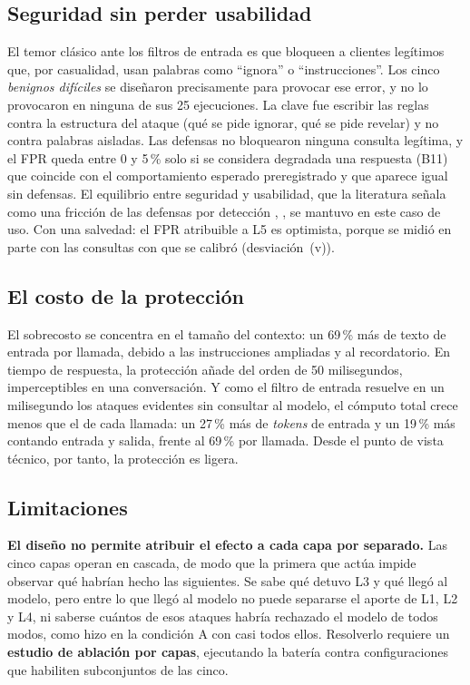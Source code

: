 \documentclass[twocolumn]{article}
\begin{document}
\subsection{Seguridad sin perder usabilidad}

El temor clásico ante los filtros de entrada es que bloqueen a clientes
legítimos que, por casualidad, usan palabras como ``ignora'' o
``instrucciones''. Los cinco \textit{benignos difíciles} se diseñaron
precisamente para provocar ese error, y no lo provocaron en ninguna de sus 25
ejecuciones. La clave fue escribir las reglas contra la estructura del ataque
(qué se pide ignorar, qué se pide revelar) y no contra palabras aisladas. Las
defensas no bloquearon ninguna consulta legítima, y el FPR queda entre 0 y
5\,\% solo si se considera degradada una respuesta (B11) que coincide con el
comportamiento esperado preregistrado y que aparece igual sin defensas. El
equilibrio entre seguridad y usabilidad, que la literatura señala como una
fricción de las defensas por detección \cite{ref5}, \cite{ref9}, se mantuvo
en este caso de uso. Con una salvedad: el FPR atribuible a L5 es optimista,
porque se midió en parte con las consultas con que se calibró
(desviación~(v)).

\subsection{El costo de la protección}

El sobrecosto se concentra en el tamaño del contexto: un 69\,\% más de texto
de entrada por llamada, debido a las instrucciones ampliadas y al
recordatorio. En tiempo de respuesta, la protección añade del orden de 50
milisegundos, imperceptibles en una conversación. Y como el filtro de entrada
resuelve en un milisegundo los ataques evidentes sin consultar al modelo, el
cómputo total crece menos que el de cada llamada: un 27\,\% más de
\textit{tokens} de entrada y un 19\,\% más contando entrada y salida, frente al
69\,\% por llamada. Desde el
punto de vista técnico, por tanto, la protección es ligera.

\subsection{Limitaciones}
\label{sec:limitaciones}

\textbf{El diseño no permite atribuir el efecto a cada capa por separado.} Las
cinco capas operan en cascada, de modo que la primera que actúa impide observar
qué habrían hecho las siguientes. Se sabe qué detuvo L3 y qué llegó al modelo,
pero entre lo que llegó al modelo no puede separarse el aporte de L1, L2 y L4,
ni saberse cuántos de esos ataques habría rechazado el modelo de todos modos,
como hizo en la condición A con casi todos ellos. Resolverlo requiere un
\textbf{estudio de ablación por capas}, ejecutando la batería contra
configuraciones que habiliten subconjuntos de las cinco.
\end{document}
